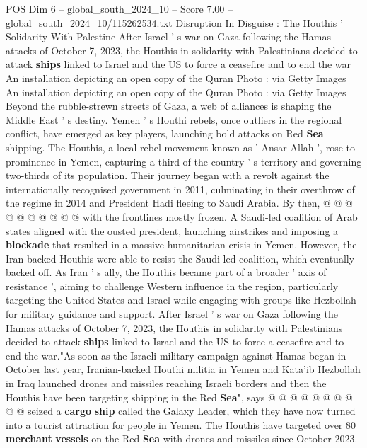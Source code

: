 \begin{textsample}{POS Dim 6 – global\_south\_2024\_10 – Score 7.00 – global\_south\_2024\_10/115262534.txt}  \label{ex:f6_pos_412}
Disruption In Disguise : The Houthis ' Solidarity With Palestine After Israel ' s war on Gaza following the Hamas attacks of October 7, 2023, the Houthis in solidarity with Palestinians decided to attack \textbf{ships} linked to Israel and the US to force a ceasefire and to end the war An installation depicting an open copy of the Quran Photo : via Getty Images An installation depicting an open copy of the Quran Photo : via Getty Images Beyond the rubble-strewn streets of Gaza, a web of alliances is shaping the Middle East ' s destiny.
Yemen ' s Houthi rebels, once outliers in the regional conflict, have emerged as key players, launching bold attacks on Red \textbf{Sea} shipping.
The Houthis, a local rebel movement known as ' Ansar Allah ', rose to prominence in Yemen, capturing a third of the country ' s territory and governing two-thirds of its population.
Their journey began with a revolt against the internationally recognised government in 2011, culminating in their overthrow of the regime in 2014 and President Hadi fleeing to Saudi Arabia.
By then, @ @ @ @ @ @ @ @ @ @ with the frontlines mostly frozen.
A Saudi-led coalition of Arab states aligned with the ousted president, launching airstrikes and imposing a \textbf{blockade} that resulted in a massive humanitarian crisis in Yemen.
However, the Iran-backed Houthis were able to resist the Saudi-led coalition, which eventually backed off.
As Iran ' s ally, the Houthis became part of a broader ' axis of resistance ', aiming to challenge Western influence in the region, particularly targeting the United States and Israel while engaging with groups like Hezbollah for military guidance and support.
After Israel ' s war on Gaza following the Hamas attacks of October 7, 2023, the Houthis in solidarity with Palestinians decided to attack \textbf{ships} linked to Israel and the US to force a ceasefire and to end the war."As soon as the Israeli military campaign against Hamas began in October last year, Iranian-backed Houthi militia in Yemen and Kata'ib Hezbollah in Iraq launched drones and missiles reaching Israeli borders and then the Houthis have been targeting shipping in the Red \textbf{Sea}", says @ @ @ @ @ @ @ @ @ @ seized a \textbf{cargo} \textbf{ship} called the Galaxy Leader, which they have now turned into a tourist attraction for people in Yemen.
The Houthis have targeted over 80 \textbf{merchant} \textbf{vessels} on the Red \textbf{Sea} with drones and missiles since October 2023.

\end{textsample}
